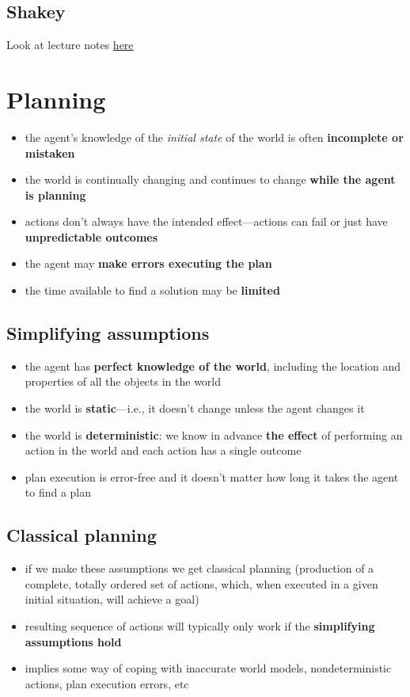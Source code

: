 \documentclass{article}
\begin{document}
\subsection{Shakey}
\begin{flushleft}
Look at lecture notes \href{https://moodle.nottingham.ac.uk/pluginfile.php/4573264/mod_resource/content/6/05%20Deliberative%20Architectures%20I.pdf}{here}
\end{flushleft}

\section{Planning}
\begin{itemize}
  \item the agent’s knowledge of the \textit{initial state} of the world is often \textbf{incomplete or mistaken }
  \item the world is continually changing and continues to change \textbf{while the agent is planning}
  \item actions don’t always have the intended effect—actions can fail or just have \textbf{unpredictable outcomes} 
  \item the agent may \textbf{make errors executing the plan} 
  \item the time available to find a solution may be \textbf{limited}
\end{itemize}

\subsection{Simplifying assumptions}
\begin{itemize}
  \item the agent has \textbf{perfect knowledge of the world}, including the location and properties of all the objects in the world 
  \item the world is \textbf{static}—i.e., it doesn’t change unless the agent changes it 
  \item the world is \textbf{deterministic}: we know in advance \textbf{the effect} of performing an action in the world and each action has a single outcome 
  \item plan execution is error-free and it doesn’t matter how long it takes the agent to find a plan
\end{itemize}

\subsection{Classical planning}
\begin{itemize}
  \item if we make these assumptions we get classical planning (production of a complete, totally ordered set of actions, which, when executed in a given initial situation, will achieve a goal)
  \item resulting sequence of actions will typically only work if the \textbf{simplifying assumptions hold} 
  \item implies some way of coping with inaccurate world models, nondeterministic actions, plan execution errors, etc
\end{itemize}
\end{document}
